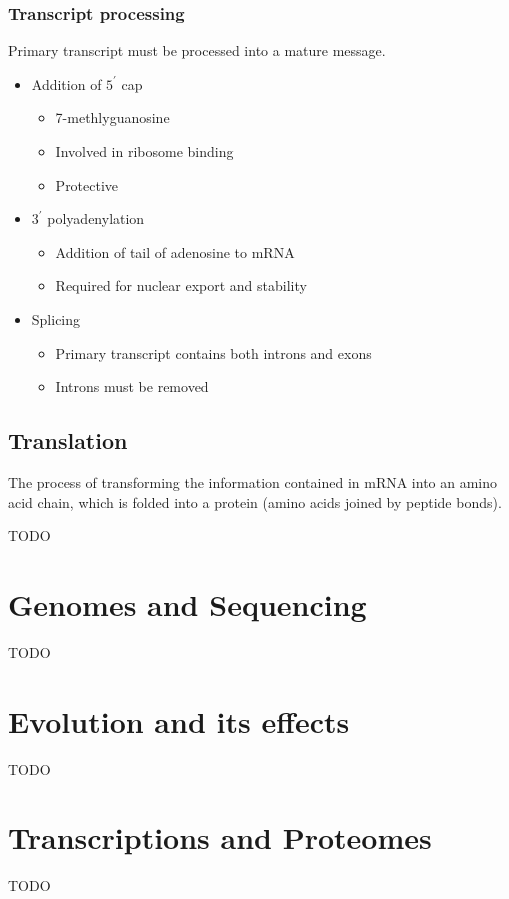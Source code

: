 \documentclass[a4paper]{article}
\begin{document}
\subsubsection{Transcript processing}

Primary transcript must be processed into a mature message.

\begin{itemize}
  \item Addition of $5^{\prime}$ cap
    \begin{itemize}
      \item 7-methlyguanosine
      \item Involved in ribosome binding
      \item Protective
    \end{itemize}
  \item $3^{\prime}$ polyadenylation
    \begin{itemize}
      \item Addition of tail of adenosine to mRNA
      \item Required for nuclear export and stability
    \end{itemize}
  \item Splicing
    \begin{itemize}
      \item Primary transcript contains both introns and exons
      \item Introns must be removed
    \end{itemize}
\end{itemize}

\subsection{Translation}

The process of transforming the information contained in mRNA into an amino acid
chain, which is folded into a protein (amino acids joined by peptide bonds).

TODO

\section{Genomes and Sequencing}

TODO

\section{Evolution and its effects}

TODO

\section{Transcriptions and Proteomes}

TODO
\end{document}
